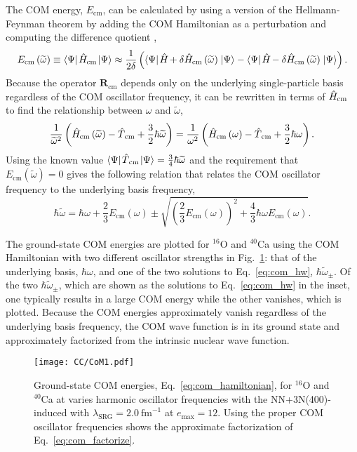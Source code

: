 \documentclass[thesis.tex]{subfiles}
\begin{document}
The COM energy, $E_{\mathrm{cm}}$, can be calculated by using a version of the Hellmann-Feynman theorem by adding the COM Hamiltonian as a perturbation and computing the difference quotient \cite{DIERCKSEN198129,ERNZERHOF199359},
\begin{equation} \label{eq:com_energy}
  E_{\mathrm{cm}}\left(\widetilde{\omega}\right) \equiv \langle \Psi |\hspace{1pt}\hat{H}\hspace{-1pt}_{\mathrm{cm}}\hspace{1pt}\lvert \Psi \rangle \approx \frac{1}{2\delta}\left(\langle \Psi |\hspace{1pt}\hat{H}\hspace{-1pt} + \delta\hat{H}\hspace{-1pt}_{\mathrm{cm}}\left(\widetilde{\omega}\right)\hspace{1pt}\lvert \Psi \rangle - \langle \Psi |\hspace{1pt}\hat{H}\hspace{-1pt} - \delta\hat{H}\hspace{-1pt}_{\mathrm{cm}}\left(\widetilde{\omega}\right)\hspace{1pt}\lvert \Psi \rangle\right).
\end{equation}
Because the operator $\mathbf{R}_{\mathrm{cm}}$ depends only on the underlying single-particle basis regardless of the COM oscillator frequency, it can be rewritten in terms of $\hat{H}\hspace{-1pt}_{\mathrm{cm}}$ to find the relationship between $\omega$ and $\widetilde{\omega}$,
\begin{equation}
  \frac{1}{\widetilde{\omega}^{2}}\left(\hat{H}\hspace{-1pt}_{\mathrm{cm}}\left(\widetilde{\omega}\right) - \hat{T}\hspace{-0.25pt}_{\mathrm{cm}} + \frac{3}{2}\hbar\widetilde{\omega}\right) = \frac{1}{\omega^{2}}\left(\hat{H}\hspace{-1pt}_{\mathrm{cm}}\left(\omega\right) - \hat{T}\hspace{-0.25pt}_{\mathrm{cm}} + \frac{3}{2}\hbar\omega\right).
\end{equation}
Using the known value $\langle \Psi |\hspace{1pt}\hat{T}\hspace{-0.25pt}_{\mathrm{cm}}\hspace{1pt}\lvert \Psi \rangle = \frac{3}{4}\hbar\widetilde{\omega}$ and the requirement that $E_{\mathrm{cm}}\left(\widetilde{\omega}\right)=0$ gives the following relation that relates the COM oscillator frequency to the underlying basis frequency,
\begin{equation} \label{eq:com_hw}
  \hbar\widetilde{\omega} = \hbar\omega + \frac{2}{3}E_{\mathrm{cm}}\left(\omega\right) \pm \sqrt{\left(\frac{2}{3}E_{\mathrm{cm}}\left(\omega\right)\right)^{2} + \frac{4}{3}\hbar\omega E_{\mathrm{cm}}\left(\omega\right)}.
\end{equation}

The ground-state COM energies are plotted for ${}^{16}$O and ${}^{40}$Ca using the COM Hamiltonian with two different oscillator strengths in Fig.\ \ref{fig:CoM_Ground_State}: that of the underlying basis, $\hbar\omega$, and one of the two solutions to Eq.\ \eqref{eq:com_hw}, $\hbar\widetilde{\omega}_{\pm}$.  Of the two $\hbar\widetilde{\omega}_{\pm}$, which are shown as the solutions to Eq.\ \eqref{eq:com_hw} in the inset, one typically results in a large COM energy while the other vanishes, which is plotted.  Because the COM energies approximately vanish regardless of the underlying basis frequency, the COM wave function is in its ground state and approximately factorized from the intrinsic nuclear wave function.
\begin{figure}[h]
  \centering
  \texttt{[image: CC/CoM1.pdf]}
  \caption{Ground-state COM energies, Eq.\ \eqref{eq:com_hamiltonian}, for ${}^{16}$O and ${}^{40}$Ca at varies harmonic oscillator frequencies with the NN+3N(400)-induced with $\lambda_{\mathrm{SRG}}=2.0\ \mathrm{fm}^{-1}$ at $e_{\mathrm{max}}=12$.  Using the proper COM oscillator frequencies shows the approximate factorization of Eq.\ \eqref{eq:com_factorize}.}
  \label{fig:CoM_Ground_State}
\end{figure}
\end{document}
